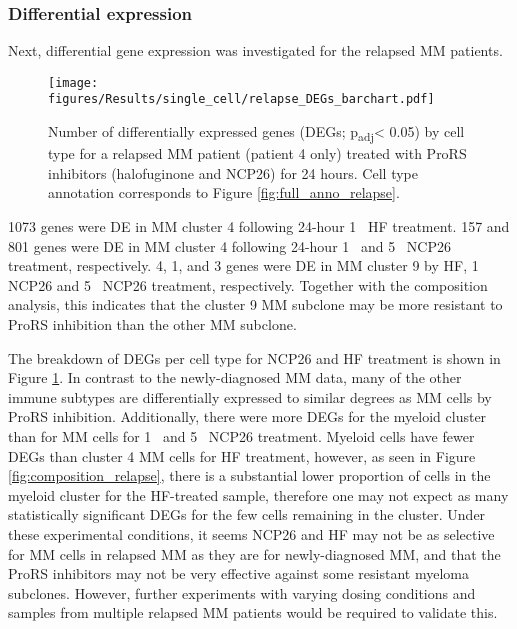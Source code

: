 \subsubsection{Differential expression}
Next, differential gene expression was investigated for the relapsed MM patients.
%
\begin{figure}[htb]
\centering
\texttt{[image: figures/Results/single\_cell/relapse\_DEGs\_barchart.pdf]}
\caption[DEGs per cell type- relapsed MM]{Number of differentially expressed genes (DEGs; p\textsubscript{adj}< 0.05) by cell type for a relapsed MM patient (patient 4 only) treated with ProRS inhibitors (halofuginone and NCP26) for 24 hours.
Cell type annotation corresponds to Figure \ref{fig:full_anno_relapse}.}
\label{fig:relapse_deg_bar}
\end{figure}
%
1073 genes were DE in MM cluster 4 following 24-hour 1\si{\micro\Molar} HF treatment.
157 and 801 genes were DE in MM cluster 4 following 24-hour 1\si{\micro\Molar}  and 5\si{\micro\Molar} NCP26 treatment, respectively.
4, 1, and 3 genes were DE in MM cluster 9 by HF, 1\si{\micro\Molar} NCP26  and 5\si{\micro\Molar} NCP26 treatment, respectively.
Together with the composition analysis, this indicates that the cluster 9 MM subclone may be more resistant to ProRS inhibition than the other MM subclone.

The breakdown of DEGs per cell type for NCP26 and HF treatment is shown in Figure \ref{fig:relapse_deg_bar}.
In contrast to the newly-diagnosed MM data, many of the other immune subtypes are differentially expressed to similar degrees as MM cells by ProRS inhibition.
Additionally, there were more DEGs for the myeloid cluster than for MM cells for 1\si{\micro\Molar} and 5\si{\micro\Molar}  NCP26 treatment.
Myeloid cells have fewer DEGs than cluster 4 MM cells for HF treatment, however, as seen in Figure \ref{fig:composition_relapse}, there is a substantial lower proportion of cells in the myeloid cluster for the HF-treated sample, therefore one may not expect as many statistically significant DEGs for the few cells remaining in the cluster.
Under these experimental conditions, it seems NCP26 and HF may not be as selective for MM cells in relapsed MM as they are for newly-diagnosed MM, and that the ProRS inhibitors may not be very effective against some resistant myeloma subclones.
However, further experiments with varying dosing conditions and samples from multiple relapsed MM patients would be required to validate this.

